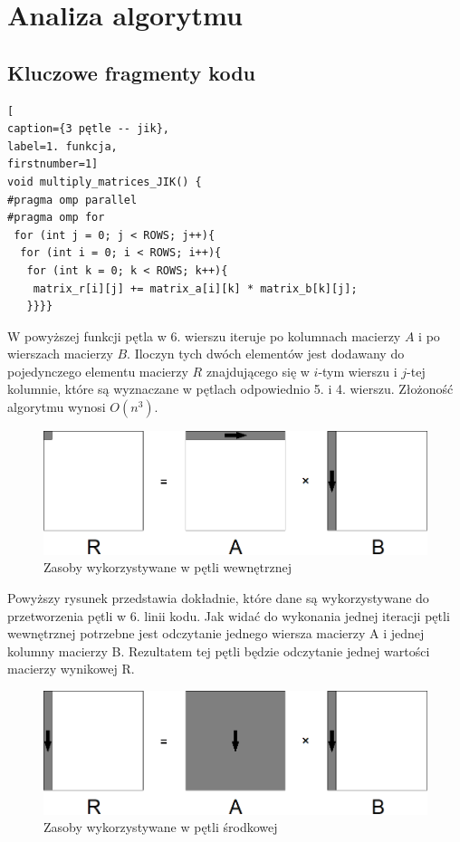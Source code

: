 \documentclass{article}
\begin{document}
\section{Analiza algorytmu}
\subsection{Kluczowe fragmenty kodu}
\begin{lstlisting}[
caption={3 pętle -- jik},
label=1. funkcja,
firstnumber=1]
void multiply_matrices_JIK() {
#pragma omp parallel
#pragma omp for 
 for (int j = 0; j < ROWS; j++){
  for (int i = 0; i < ROWS; i++){
   for (int k = 0; k < ROWS; k++){
    matrix_r[i][j] += matrix_a[i][k] * matrix_b[k][j];
   }}}}
\end{lstlisting}

W powyższej funkcji pętla w 6. wierszu iteruje po kolumnach macierzy $A$ i po wierszach macierzy $B$. Iloczyn tych dwóch elementów jest dodawany do pojedynczego elementu macierzy $R$ znajdującego się w $i$-tym wierszu i $j$-tej kolumnie, które są wyznaczane w pętlach odpowiednio 5. i 4. wierszu. Złożoność algorytmu wynosi $O(n^3)$.

\begin{figure}[H]
	\centering
	\includegraphics[width=\linewidth]{./images/3/lokIn.png}
	\caption{Zasoby wykorzystywane w pętli wewnętrznej}
	\label{fig:3inner}
\end{figure}

Powyższy rysunek przedstawia dokładnie, które dane są wykorzystywane do przetworzenia pętli w 6. linii kodu. Jak widać do wykonania jednej iteracji pętli wewnętrznej potrzebne jest odczytanie jednego wiersza macierzy A i jednej kolumny macierzy B. Rezultatem tej pętli będzie odczytanie jednej wartości macierzy wynikowej R.

\begin{figure}[H]
	\centering
	\includegraphics[width=\linewidth]{./images/3/lokMed.png}
	\caption{Zasoby wykorzystywane w pętli środkowej}
	\label{fig:3medium}
\end{figure}
\end{document}
